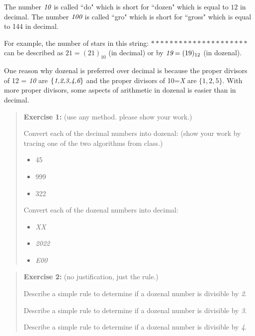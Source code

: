 \documentclass[10pt,letterpaper,unboxed,cm]{article}
\begin{document}
\begin{enumerate}
	      The number $\emph{10}$ is called ``do" which is short for ``dozen" which is equal to $12$ in decimal. The number $\emph{100}$ is called ``gro" which is short for ``gross" which is equal to 144 in decimal.

	      For example, the number of stars in this string: $*********************$ can be described as $21=(21)_{10}$ (in decimal) or by $\emph{19}=(19)_{12}$ (in dozenal).

	      One reason why dozenal is preferred over decimal is because the proper divisors of 12 = \emph{10} are $\{\emph{1,2,3,4,6}\}$ and the proper divisors of 10=\emph{X} are $\{1,2,5\}$. With more proper divisors, some aspects of arithmetic in dozenal is easier than in decimal.

	      \begin{quote}
		      {\bf Exercise 1:} (use any method. please show your work.)

		      Convert each of the decimal numbers into dozenal: (show your work by tracing one of the two algorithms from class.)

		      \begin{itemize}
			      \item
			            45
			      \item
			            999
			      \item
			            322
		      \end{itemize}

		      Convert each of the dozenal numbers into decimal:

		      \begin{itemize}
			      \item
			            \emph{XX}
			      \item
			            \emph{2022}
			      \item
			            \emph{E00}
		      \end{itemize}
	      \end{quote}

	      \begin{quote}
		      {\bf Exercise 2:} (no justification, just the rule.)

		      Describe a simple rule to determine if a dozenal number is divisible by \emph{2}.

		      Describe a simple rule to determine if a dozenal number is divisible by \emph{3}.

		      Describe a simple rule to determine if a dozenal number is divisible by \emph{4}.


\end{quote}
\end{enumerate}
\end{document}
